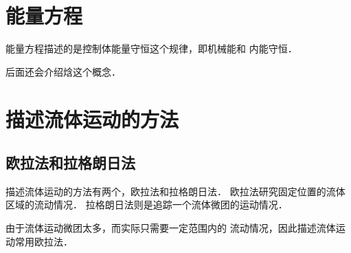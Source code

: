\section{能量方程}
能量方程描述的是控制体能量守恒这个规律，即机械能和
内能守恒．
\begin{note}
	后面还会介绍焓这个概念．
\end{note}

\section{描述流体运动的方法}
\subsection{欧拉法和拉格朗日法}
描述流体运动的方法有两个，欧拉法和拉格朗日法．
欧拉法研究固定位置的流体区域的流动情况．
拉格朗日法则是追踪一个流体微团的运动情况．
\begin{note}
	由于流体运动微团太多，而实际只需要一定范围内的
	流动情况，因此描述流体运动常用欧拉法．
\end{note}

